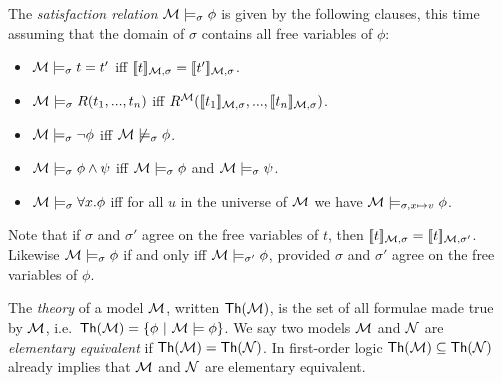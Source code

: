 \NI The \emph{satisfaction relation} $\mathcal{M} \models_{\sigma} \phi$
is given by the following clauses, this time assuming that the domain
of $\sigma$ contains all free variables of $\phi$:
\begin{itemize}

\item $\mathcal{M} \models_{\sigma} t = t'$ iff $\lbrack\!\lbrack t \rbrack\!\rbrack_{\mathcal{M}, \sigma} = \lbrack\!\lbrack t' \rbrack\!\rbrack_{\mathcal{M}, \sigma}$.
\item $\mathcal{M} \models_{\sigma} R(t_1, ..., t_n)$ iff
  $R^{\mathcal{M}}(\lbrack\!\lbrack t_1 \rbrack\!\rbrack_{\mathcal{M}, \sigma}, ..., \lbrack\!\lbrack t_n \rbrack\!\rbrack_{\mathcal{M},
  \sigma})$.
\item $\mathcal{M} \models_{\sigma} \neg \phi$ iff $\mathcal{M} \not\models_{\sigma} \phi$.
\item $\mathcal{M} \models_{\sigma} \phi \land \psi$ iff $\mathcal{M} \models_{\sigma} \phi$ and $\mathcal{M} \models_{\sigma} \psi$.
\item $\mathcal{M} \models_{\sigma} \forall x.\phi$ iff for all $u$ in the
  universe of $\mathcal{M}$ we have $\mathcal{M} \models_{\sigma, x \mapsto v} \phi$.

\end{itemize}

\NI Note that if $\sigma$ and $\sigma'$ agree on the free variables of
$t$, then $\lbrack\!\lbrack t \rbrack\!\rbrack_{\mathcal{M}, \sigma} =\lbrack\!\lbrack t \rbrack\!\rbrack_{\mathcal{M},
  \sigma'}$. Likewise $\mathcal{M} \models_{\sigma} \phi$ if and only iff
$\mathcal{M} \models_{\sigma'} \phi$, provided $\sigma$ and $\sigma'$ agree
on the free variables of $\phi$.

The \emph{theory} of a model $\mathcal{M}$, written $\mathsf{Th}(\mathcal{M})$, is
the set of all formulae made true by $\mathcal{M}$, i.e.~$\mathsf{Th}(\mathcal{M})
= \{\phi\ |\ \mathcal{M}\models \phi\}$. We say two models $\mathcal{M}$ and
$\mathcal{N}$ are \emph{elementary equivalent} if $\mathsf{Th}(\mathcal{M}) =
\mathsf{Th}(\mathcal{N})$. In first-order logic $\mathsf{Th}(\mathcal{M}) \subseteq
\mathsf{Th}(\mathcal{N})$ already implies that $\mathcal{M}$ and $\mathcal{N}$ are
elementary equivalent.
